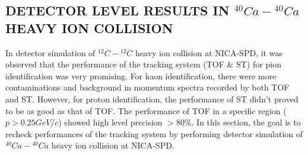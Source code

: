\documentclass[12pt, twocolumn]{article}
\begin{document}
\clearpage




\subsection{DETECTOR LEVEL RESULTS IN $^{40}Ca-{^{40}Ca}$ HEAVY ION COLLISION}
\label{DETECTOR LEVEL RESULTS IN Ca-Ca HEAVY ION COLLISION}
In detector simulation of $^{12}C-{^{12}C}$ heavy ion collision at NICA-SPD, it was observed that the performance of the tracking system (TOF \& ST) for pion identification was very promising. For kaon identification, there were more contaminations and background in momentum spectra recorded by both TOF and ST. However, for proton identification, the performance of ST didn't proved to be as good as that of TOF. The performance of TOF in a specific region ($p > 0.25GeV/c$) showed high level precision $>80\%$. In this section, the goal is to recheck performances of the tracking system by performing detector simulation of $^{40}Ca-{^{40}Ca}$ heavy ion collision at NICA-SPD.
\end{document}
